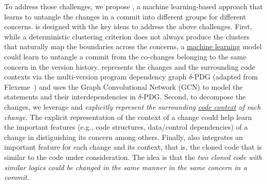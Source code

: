 To address those challenges, we propose {\tool}, a machine
learning-based approach that learns to untangle the changes in a
commit into different groups for different concerns. {\tool} is
designed with the key ideas to address the above challenges. First,
while a deterministic clustering criterion does not always produce the
clusters that naturally map the boundaries across the concerns, a
\underline{machine learning} model could learn to untangle a commit
from the co-changes belonging to the same concern in the version
history.  {\tool} represents the changes and the surrounding code
contexts via the multi-version program dependency graph $\delta$-PDG
(adapted from Flexeme~\cite{flexeme-fse20}) and uses the Graph
Convolutional Network (GCN) to model the statements and their
interdependencies in $\delta$-PDG. Second, to decompose the changes,
we leverage and {\em explicitly represent the surrounding
  \underline{code context} of each change}. The explicit
representation of the context of a change could help {\tool} learn the
important features (e.g., code structures, data/control dependencies)
of a change in distiguishing its concern among others. Finally,
{\tool} also integrates an important feature for each change and its
context, that is, the cloned code that is similar to the code under
consideration. The idea is that the {\em two cloned code with similar
logics could be changed in the same manner in the same concern in a
commit}.
